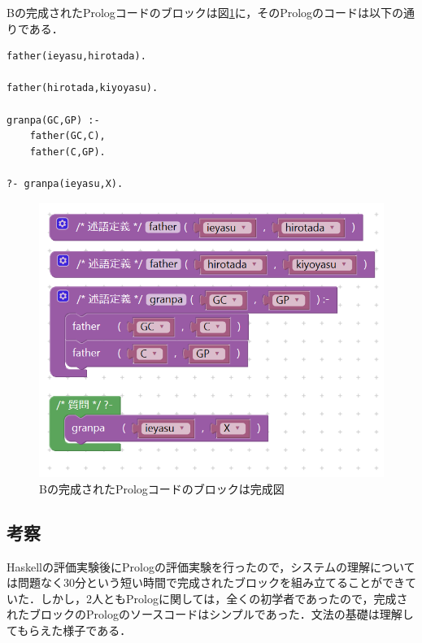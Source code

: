 \documentclass{risepaper}
\begin{document}
\begin{itemize}
Bの完成されたPrologコードのブロックは図\ref{fig:prolog_experiment_result_b}に，そのPrologのコードは以下の通りである．
\begin{lstlisting}[basicstyle=\ttfamily\footnotesize]
father(ieyasu,hirotada).

father(hirotada,kiyoyasu).

granpa(GC,GP) :-
    father(GC,C),
    father(C,GP).

?- granpa(ieyasu,X).
\end{lstlisting}

\begin{figure}[h]
\begin{center}
\includegraphics[scale=0.5]{img/prolog_experiment_result_b.PNG}
\caption{Bの完成されたPrologコードのブロックは完成図}%
\label{fig:prolog_experiment_result_b}
\end{center}%
\end{figure}%

\end{itemize} 
        
		\subsection{考察}
        
Haskellの評価実験後にPrologの評価実験を行ったので，システムの理解については問題なく30分という短い時間で完成されたブロックを組み立てることができていた．しかし，2人ともPrologに関しては，全くの初学者であったので，完成されたブロックのPrologのソースコードはシンプルであった．文法の基礎は理解してもらえた様子である．
\end{document}
